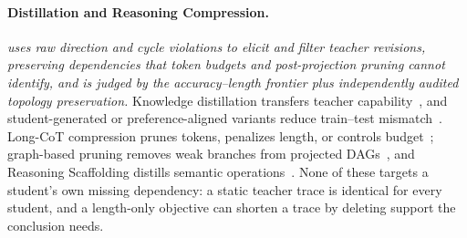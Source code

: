 \paragraph{Distillation and Reasoning Compression.}
\textit{\framework uses raw direction and cycle violations to elicit and filter teacher revisions, preserving dependencies that token budgets and post-projection pruning cannot identify, and is judged by the accuracy--length frontier plus independently audited topology preservation.} Knowledge distillation transfers teacher capability~\citep{hinton2015distilling}, and student-generated or preference-aligned variants reduce train--test mismatch~\citep{minillm2023,agarwal2024gkd,ko2024distillm,yang2026exopd,sessa2024bond,xu2025kdrl,ye2025gad}. Long-CoT compression prunes tokens, penalizes length, or controls budget~\citep{xia2025tokenskip,luo2025o1,arora2026training,aggarwal2025l1,muennighoff2025s1}; graph-based pruning removes weak branches from projected DAGs~\citep{yuan2026graphpruning}, and Reasoning Scaffolding distills semantic operations~\citep{wen2026scaffolding}. None of these targets a student's own missing dependency: a static teacher trace is identical for every student, and a length-only objective can shorten a trace by deleting support the conclusion needs.
